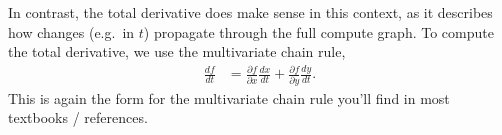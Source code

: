 \documentclass{article}
\newcommand{\dd}[2][]{\frac{\partial #1}{\partial #2}}
\newcommand{\dt}[2][]{\frac{d #1}{d #2}}
\begin{document}
In contrast, the total derivative does make sense in this context, as it describes how changes (e.g.\ in $t$) propagate through the full compute graph.
To compute the total derivative, we use the multivariate chain rule,
\begin{align}
  \dt[f]{t} &= \dd[f]{x} \dt[x]{t} + \dd[f]{y} \dt[y]{t}.
\end{align}
This is again the form for the multivariate chain rule you'll find in most textbooks / references.
%
%
\end{document}
